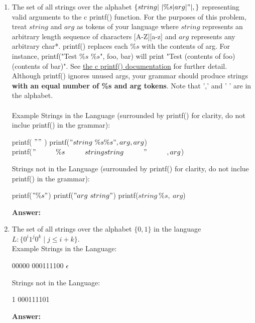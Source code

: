 \documentclass[11pt]{article}
\newcommand\tab[1][1cm]{\hspace*{#1}}
\begin{document}
\begin{enumerate}
\begin{enumerate}
  \newpage
    \item The set of all strings over the alphabet $\{string|\ |\%s|arg|"|,\}$ representing valid arguments to the c printf() function. For the purposes of this problem, treat $string$ and $arg$ as tokens of your language where $string$ represents an arbitrary length sequence of characters [A-Z][a-z] and $arg$ represents any arbitrary char*. printf() replaces each $\%s$ with the contents of arg. For instance, printf("Test $\%s$ $\%s$", foo, bar) will print "Test (contents of foo) (contents of bar)". See \href{http://www.cplusplus.com/reference/cstdio/printf/}{the c printf() documentation} for further detail. Although printf() ignores unused args, your grammar should produce strings \textbf{with an equal number of \%s and arg tokens}. Note that ',' and ' ' are in the alphabet. \\ \\ 
    Example Strings in the Language (surrounded by printf() for clarity, do not inclue printf() in the grammar): 
    \begin{center}
    printf( $""$ ) \tab \tab  printf($"string\ \%s\%s", arg, arg$) \\  printf($"\tab \%s \tab stringstring\tab"\tab,arg$\tab)
    \end{center}
    Strings not in the Language (surrounded by printf() for clarity, do not inclue printf() in the grammar): 
    \begin{center}
    printf($"\%s"$)  \tab printf($"arg \ string"$)  \tab printf($string \ \%s , \ arg$)
    \end{center} 
    \textbf{Answer:} 
  
  \newpage
    \item  The set of all strings over the alphabet $\{0, 1\}$ in the language $L:\{0^i1^j0^k \mid j \leq i + k\}$. \\ 
    Example Strings in the Language: 
    \begin{center}
    00000 \tab \tab 000111100  \tab \tab $\epsilon$ 
    \end{center}
    Strings not in the Language: 
    \begin{center}
    1   \tab \tab 000111101
    \end{center}
    \textbf{Answer:} 
  

\end{enumerate}
\end{enumerate}
\end{document}

